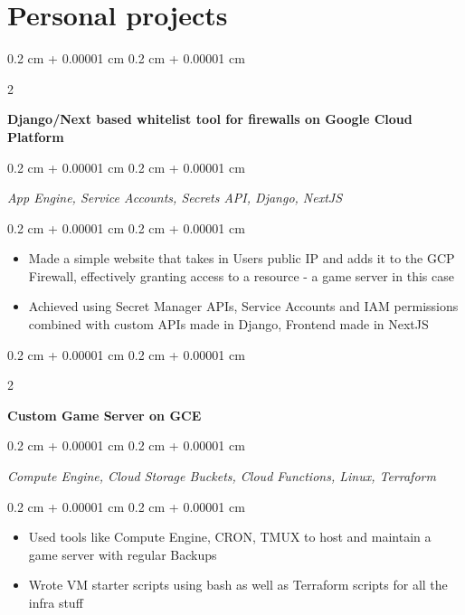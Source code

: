 \documentclass[10pt, letterpaper]{article}
\newenvironment{highlights}{
    \begin{itemize}[
        topsep=0.10 cm,
        parsep=0.10 cm,
        partopsep=0pt,
        itemsep=0pt,
        leftmargin=0.4 cm + 10pt
    ]
}{
    \end{itemize}
} %
\newenvironment{onecolentry}{
    \begin{adjustwidth}{
        0.2 cm + 0.00001 cm
    }{
        0.2 cm + 0.00001 cm
    }
}{
    \end{adjustwidth}
} %
\newenvironment{twocolentry}[2][]{
    \onecolentry
    \def\secondColumn{#2}
    \setcolumnwidth{\fill, 4.5 cm}
    \begin{paracol}{2}
}{
    \switchcolumn \raggedleft \secondColumn
    \end{paracol}
    \endonecolentry
} %
\let\hrefWithoutArrow\href
\renewcommand{\href}[2]{\hrefWithoutArrow{#1}{\ifthenelse{\equal{#2}{}}{ }{#2 }\raisebox{.15ex}{\footnotesize \faExternalLink*}}}
\begin{document}
\section{Personal projects}

\begin{twocolentry}            {

        \textit{\href{https://github.com/apparentlyarhm/validateapp}{github}}}
    \textbf{Django/Next based whitelist tool for firewalls on Google Cloud Platform}
\end{twocolentry}
\begin{onecolentry}
    \textit{App Engine, Service Accounts, Secrets API, Django, NextJS}

\end{onecolentry}

\vspace{0.2 cm}
\begin{onecolentry}
    \begin{highlights}
        \item {Made a simple website that takes in Users public IP and adds it to the GCP Firewall, effectively granting access to a resource - a game server in this case}
        \item {Achieved using Secret Manager APIs, Service Accounts and IAM permissions combined with custom APIs made in Django, Frontend made in NextJS}

    \end{highlights}
\end{onecolentry}

\vspace{0.2 cm}

\begin{twocolentry}            {

        \textit{}}
    \textbf{Custom Game Server on GCE}
\end{twocolentry}

\begin{onecolentry}
    \textit{Compute Engine, Cloud Storage Buckets, Cloud Functions, Linux, Terraform}
\end{onecolentry}
\vspace{0.2 cm}
\begin{onecolentry}
    \begin{highlights}
        \item {Used tools like Compute Engine, CRON, TMUX to host and maintain a game server with regular Backups}
        \item Wrote VM starter scripts using bash as well as Terraform scripts for all the
        infra stuff
    \end{highlights}
\end{onecolentry}

\vspace{0.2 cm}
\end{document}
